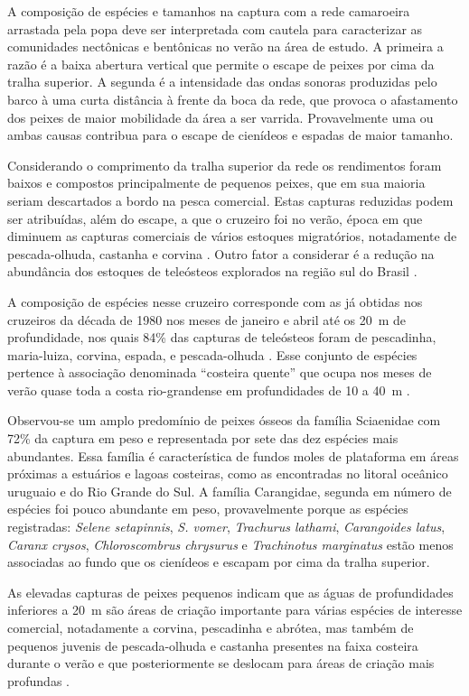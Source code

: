 \documentclass[a4paper,11pt,twoside,showtrims,onecolumn,openright,final]{memoir}
\begin{document}
A composição de espécies e tamanhos na captura com a rede camaroeira arrastada pela popa 
deve ser interpretada com cautela para caracterizar as comunidades nectônicas e bentônicas 
no verão na área de estudo. A primeira a razão é a baixa abertura vertical que permite o escape 
de peixes por cima da tralha superior. A segunda é a intensidade das ondas sonoras produzidas 
pelo barco à uma curta distância à frente da boca da rede, que provoca o afastamento dos peixes 
de maior mobilidade da área a ser varrida. Provavelmente uma ou ambas causas contribua para o escape 
de cienídeos e espadas de maior tamanho.

Considerando o comprimento da tralha superior da rede os rendimentos foram baixos e compostos 
principalmente de pequenos peixes, que em sua maioria seriam descartados a bordo na pesca comercial. 
Estas capturas reduzidas podem ser atribuídas, além do escape, a que o cruzeiro foi no verão, época 
em que diminuem as capturas comerciais de vários estoques migratórios, notadamente de pescada-olhuda,
castanha e corvina \citep{haimovici1997b}.
Outro fator a considerar é a redução na abundância dos estoques de teleósteos explorados na região 
sul do Brasil \citep{cergole2005}.

A composição de espécies nesse cruzeiro corresponde com as já obtidas nos cruzeiros da década de 1980 
nos meses de janeiro e abril até os 20~m de profundidade, nos quais 84\% das capturas de teleósteos 
foram de pescadinha, maria-luiza, corvina, espada, e pescada-olhuda \citep{HAIMOVICI1996B}.
Esse conjunto de espécies pertence à associação denominada ``costeira quente'' que ocupa nos meses 
de verão quase toda a costa rio-grandense em profundidades de 10 a 40~m \citep{martins2000a}. 

Observou-se um amplo predomínio de peixes ósseos da família Sciaenidae com 72\% da captura em peso 
e representada por sete das dez espécies mais abundantes. Essa família é característica de fundos moles 
de plataforma em áreas próximas a estuários e lagoas costeiras, como as encontradas no litoral oceânico 
uruguaio e do Rio Grande do Sul. A família Carangidae, segunda em número de espécies foi pouco abundante 
em peso, provavelmente porque as espécies registradas: \emph{Selene setapinnis}, \emph{S. vomer}, \emph{Trachurus lathami}, 
\emph{Carangoides latus}, \emph{Caranx crysos}, \emph{Chloroscombrus chrysurus} e \emph{Trachinotus marginatus} 
estão menos associadas ao fundo que os cienídeos e escapam por cima da tralha superior.

As elevadas capturas de peixes pequenos indicam que as águas de profundidades inferiores a 20~m 
são áreas de criação importante para várias espécies de interesse comercial, notadamente a corvina, 
pescadinha e abrótea, mas também de pequenos juvenis de pescada-olhuda e castanha presentes na faixa 
costeira durante o verão e que posteriormente se deslocam para áreas 
de criação mais profundas \citep{HAIMOVICI1996B}.
\end{document}

